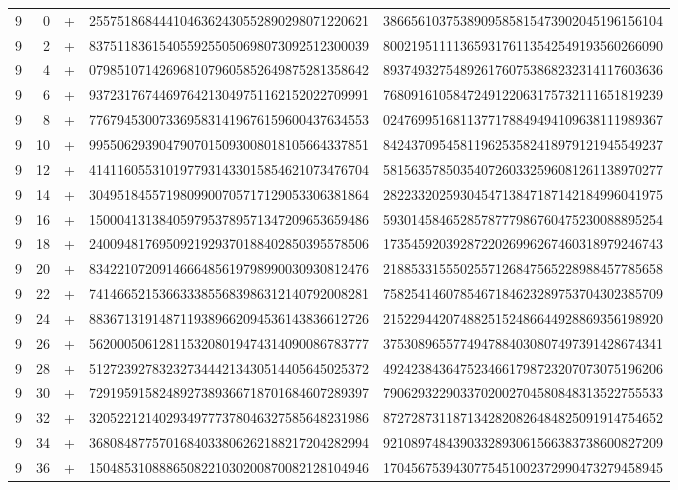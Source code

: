 \begin{longtable}{rrrll}
9 & 0 & + & 2557518684441046362430552890298071220621 & 3866561037538909585815473902045196156104 \\
9 & 2 & + & 8375118361540559255050698073092512300039 & 8002195111136593176113542549193560266090 \\
9 & 4 & + & 0798510714269681079605852649875281358642 & 8937493275489261760753868232314117603636 \\
9 & 6 & + & 9372317674469764213049751162152022709991 & 7680916105847249122063175732111651819239 \\
9 & 8 & + & 7767945300733695831419676159600437634553 & 0247699516811377178849494109638111989367 \\
9 & 10 & + & 9955062939047907015093008018105664337851 & 8424370954581196253582418979121945549237 \\
9 & 12 & + & 4141160553101977931433015854621073476704 & 5815635785035407260332596081261138970277 \\
9 & 14 & + & 3049518455719809900705717129053306381864 & 2822332025930454713847187142184996041975 \\
9 & 16 & + & 1500041313840597953789571347209653659486 & 5930145846528578777986760475230088895254 \\
9 & 18 & + & 2400948176950921929370188402850395578506 & 1735459203928722026996267460318979246743 \\
9 & 20 & + & 8342210720914666485619798990030930812476 & 2188533155502557126847565228988457785658 \\
9 & 22 & + & 7414665215366333855683986312140792008281 & 7582541460785467184623289753704302385709 \\
9 & 24 & + & 8836713191487119389662094536143836612726 & 2152294420748825152486644928869356198920 \\
9 & 26 & + & 5620005061281153208019474314090086783777 & 3753089655774947884030807497391428674341 \\
9 & 28 & + & 5127239278323273444213430514405645025372 & 4924238436475234661798723207073075196206 \\
9 & 30 & + & 7291959158248927389366718701684607289397 & 7906293229033702002704580848313522755533 \\
9 & 32 & + & 3205221214029349777378046327585648231986 & 8727287311871342820826484825091914754652 \\
9 & 34 & + & 3680848775701684033806262188217204282994 & 9210897484390332893061566383738600827209 \\
9 & 36 & + & 1504853108886508221030200870082128104946 & 1704567539430775451002372990473279458945 \\

\end{longtable}
